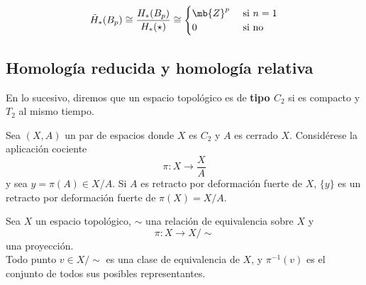 \begin{cor}
\end{cor}

\begin{ejem}
$$\tilde{H}_*(B_p)\cong\frac{H_*(B_p)}{H_*(\star)}\cong\begin{cases}\mb{Z}^p & \mbox{ si } n=1\\0 & \mbox{ si no}\end{cases}$$
\end{ejem}

\subsection{Homología reducida y homología relativa}
En lo sucesivo, diremos que un espacio topológico es de \textbf{tipo $C_2$} si es compacto y $T_2$ al mismo tiempo.

\begin{lema}\label{RetrCoci}
Sea $(X,A)$ un par de espacios donde $X$ es $C_2$ y $A$ es cerrado $X$. Considérese la aplicación cociente $$\pi: X \longrightarrow \frac{X}{A}$$ y sea $y=\pi(A) \in X/A$. Si $A$ es retracto por deformación fuerte de $X$, $\{y\}$ es un retracto por deformación fuerte de $\pi(X)=X/A$.
\end{lema}

\begin{nota}
Sea $X$ un espacio topológico, $\sim$ una relación de equivalencia sobre $X$ y $$\pi: X \longrightarrow X/\sim$$ una proyección.
\\

Todo punto $v \in X/\sim$ es una clase de equivalencia de $X$, y $\pi^{-1}(v)$ es el conjunto de todos sus posibles representantes.
\end{nota}

